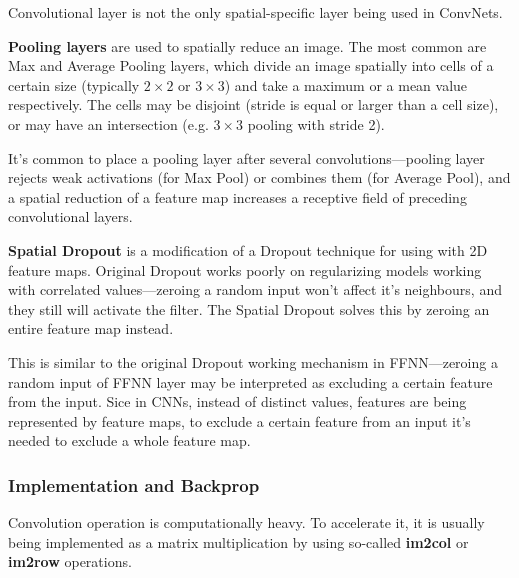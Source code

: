 \documentclass[thesis=B,english]{FITthesis}[2019/12/23]
\begin{document}
	Convolutional layer is not the only spatial-specific layer being used in ConvNets.
	
	\textbf{Pooling layers} are used to spatially reduce an image. The most common are Max and Average Pooling layers, which divide an image spatially into cells of a certain size (typically $2 \times 2$ or $3 \times 3$) and take a maximum or a mean value respectively. The cells may be disjoint (stride is equal or larger than a cell size), or may have an intersection (e.g. $3 \times 3$ pooling with stride 2).
	
	It's common to place a pooling layer after several convolutions---pooling layer rejects weak activations (for Max Pool) or combines them (for Average Pool), and a spatial reduction of a feature map increases a receptive field of preceding convolutional layers.
	
	\textbf{Spatial Dropout} is a modification of a Dropout technique for using with 2D feature maps. Original Dropout works poorly on regularizing models working with correlated values---zeroing a random input won't affect it's neighbours, and they still will activate the filter. The Spatial Dropout solves this by zeroing an entire feature map instead.
	
	This is similar to the original Dropout working mechanism in FFNN---zeroing a random input of FFNN layer may be interpreted as excluding a certain feature from the input. Sice in CNNs, instead of distinct values, features are being represented by feature maps, to exclude a certain feature from an input it's needed to exclude a whole feature map.
	
	\subsubsection{Implementation and Backprop}
	Convolution operation is computationally heavy. To accelerate it, it is usually being implemented as a matrix multiplication by using so-called \textbf{im2col} or \textbf{im2row} operations.
	
\end{document}
